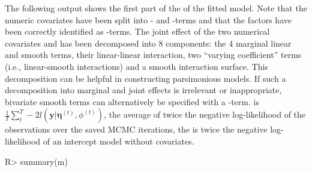 \documentclass[article, shortnames, nojss, noheadings, notitle]{jss}
\begin{document}
The following output shows the first part of the  of the fitted model.
Note that the numeric covariates have been split into - and -terms and that the factors
have been correctly identified as -terms. The joint effect of the two numerical covariates  and 
has been decomposed into 8 components: the 4 marginal linear and smooth terms, their linear-linear interaction, two ``varying coefficient'' terms
(i.e., linear-smooth interactions) and a smooth interaction surface. This decomposition can be helpful in constructing parsimonious models.
If such a decomposition into marginal and joint effects is irrelevant or inappropriate, bivariate smooth terms can alternatively be specified with a -term.
 is $\tfrac{1}{T}\sum^T_t -2l(\bm y| \bm \eta^{(t)}, \phi^{(t)})$, the average of twice the negative
log-likelihood of the observations over the saved MCMC iterations, the  is twice the negative
log-likelihood of an intercept model without covariates.
\begin{Schunk}
\begin{Sinput}
R> summary(m)
\end{Sinput}
\end{Schunk}
\end{document}
